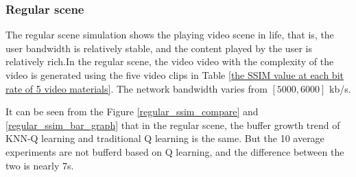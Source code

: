 \documentclass[twocolumn]{article}
\begin{document}
\subsubsection{Regular scene}
The regular scene simulation shows the playing video scene in life, 
that is, the user bandwidth is relatively stable, and the content played 
by the user is relatively rich.In the regular scene, the video video with the complexity 
of the video is generated using the five video clips in Table \ref{the SSIM value at each bit rate of 5 video materials}. 
The network bandwidth varies from $\left[5000,6000\right]$ kb/s.

It can be seen from the Figure \ref{regular_ssim_compare} and \ref{regular_ssim_bar_graph} that in the regular scene, 
the buffer growth trend of KNN-Q learning and traditional Q learning is the same.
But the 10 average experiments are not bufferd based on Q learning, and the difference between the two is nearly 7s.
\end{document}

